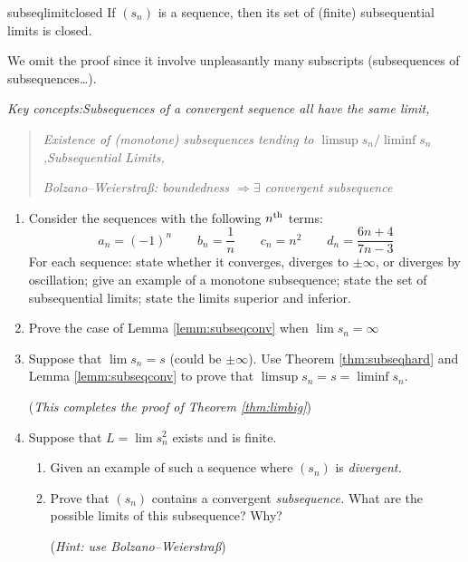 \begin{thm}{}{subseqlimitclosed}
If $(s_n)$ is a sequence, then its set of (finite) subsequential limits is closed.
\end{thm}

We omit the proof since it involve unpleasantly many subscripts (subsequences of subsequences\ldots).
 \vfil

\goodbreak


\begin{exercises}{}{}
	\emph{Key concepts:\quad Subsequences of a convergent sequence all have the same limit,}\vspace{-5pt}
	\begin{quote}
		\emph{Existence of (monotone) subsequences tending to $\limsup s_n/\liminf s_n$,\quad Subsequential Limits,}\par
		\emph{Bolzano--Weierstraß: boundedness $\Longrightarrow \exists$ convergent subsequence}
	\end{quote}
	
	\begin{enumerate}
	  \item%
	  Consider the sequences with the following $n\textsuperscript{th}$ terms:
		\[
			a_n=(-1)^n\qquad b_n=\frac 1n\qquad c_n=n^2\qquad d_n=\frac{6n+4}{7n-3}
		\]
		For each sequence: state whether it converges, diverges to $\pm\infty$, or diverges by oscillation; give an example of a monotone subsequence; state the set of subsequential limits; state the limits superior and inferior.
  
  
  	\item Prove the case of Lemma \ref{lemm:subseqconv} when $\lim s_n=\infty$
  

		\item\label{exs:liminfsuplim} Suppose that $\lim s_n=s$ (could be $\pm \infty$). Use Theorem \ref{thm:subseqhard} and Lemma \ref{lemm:subseqconv} to prove that $\limsup s_n=s=\liminf s_n$.\par
		(\emph{This completes the proof of Theorem \ref{thm:limbig}})
	
  
		\item Suppose that $L=\lim s_n^2$ exists and is finite.
		\begin{enumerate}
		  \item Given an example of such a sequence where $(s_n)$ is \emph{divergent.}
		  \item Prove that $(s_n)$ contains a convergent \emph{subsequence.} What are the possible limits of this subsequence? Why?\par
		(\emph{Hint: use Bolzano--Weierstraß})
		\end{enumerate}
		

\end{enumerate}
\end{exercises}
